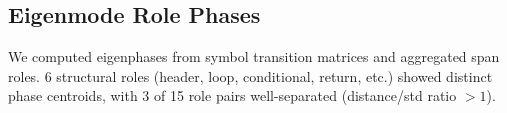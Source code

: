 \subsection{Eigenmode Role Phases}
We computed eigenphases from symbol transition matrices and aggregated span roles.
6 structural roles (header, loop, conditional, return, etc.) showed distinct phase centroids,
with 3 of 15 role pairs well-separated (distance/std ratio \(>1\)).

